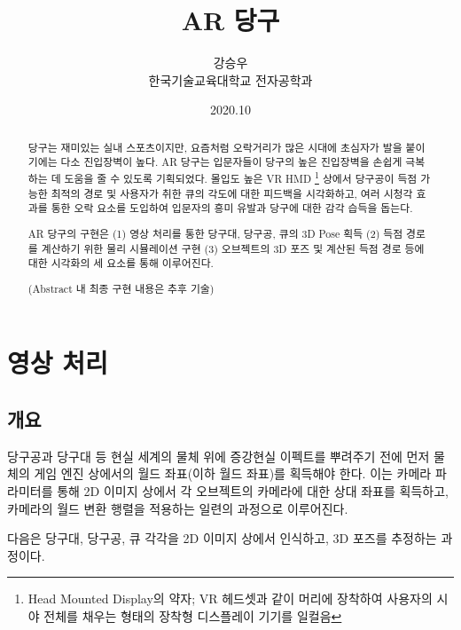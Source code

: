 \documentclass[11pt]{oblivoir}
\title{AR 당구}
\author{강승우 \\ 한국기술교육대학교 전자공학과}
\date{2020.10}
\begin{document}
\maketitle

\setlength{\parindent}{0.3cm}


\begin{abstract}

        당구는 재미있는 실내 스포츠이지만, 요즘처럼 오락거리가 많은 시대에 초심자가 발을 붙이기에는 다소 진입장벽이 높다. AR 당구는 입문자들이 당구의 높은 진입장벽을 손쉽게 극복하는 데 도움을 줄 수 있도록 기획되었다. 몰입도 높은 VR HMD
        \footnote{Head Mounted Display의 약자; VR 헤드셋과 같이 머리에 장착하여 사용자의 시야 전체를 채우는 형태의 장착형 디스플레이 기기를 일컬음}
        상에서 당구공이 득점 가능한 최적의 경로 및 사용자가 취한 큐의 각도에 대한 피드백을 시각화하고, 여러 시청각 효과를 통한 오락 요소를 도입하여 입문자의 흥미 유발과 당구에 대한 감각 습득을 돕는다.

        AR 당구의 구현은 (1) 영상 처리를 통한 당구대, 당구공, 큐의 3D Pose 획득 (2) 득점 경로를 계산하기 위한 물리 시뮬레이션 구현 (3) 오브젝트의 3D 포즈 및 계산된 득점 경로 등에 대한 시각화의 세 요소를 통해 이루어진다.

        (Abstract 내 최종 구현 내용은 추후 기술)
\end{abstract}

\newpage




\section{영상 처리}
\subsection{개요}

당구공과 당구대 등 현실 세계의 물체 위에 증강현실 이펙트를 뿌려주기 전에 먼저 물체의 게임 엔진 상에서의 월드 좌표(이하 월드 좌표)를 획득해야 한다. 이는 카메라 파라미터를 통해 2D 이미지 상에서 각 오브젝트의 카메라에 대한 상대 좌표를 획득하고, 카메라의 월드 변환 행렬을 적용하는 일련의 과정으로 이루어진다.

다음은 당구대, 당구공, 큐 각각을 2D 이미지 상에서 인식하고, 3D 포즈를 추정하는 과정이다.
\end{document}
